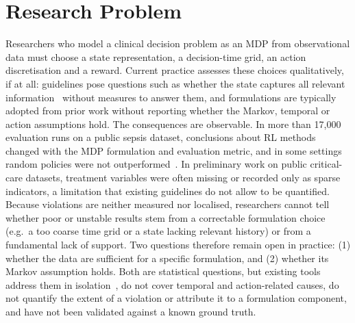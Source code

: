 \documentclass[runningheads]{llncs}
\begin{document}
\section{Research Problem}
Researchers who model a clinical decision problem as an MDP from observational data must choose a state representation, a decision-time grid, an action discretisation and a reward. Current practice assesses these choices qualitatively, if at all: guidelines pose questions such as whether the state captures all relevant information~\cite{Gottesman2019} without measures to answer them, and formulations are typically adopted from prior work without reporting whether the Markov, temporal or action assumptions hold. The consequences are observable. In more than 17,000 evaluation runs on a public sepsis dataset, conclusions about RL methods changed with the MDP formulation and evaluation metric, and in some settings random policies were not outperformed~\cite{Luo2024}. In preliminary work on public critical-care datasets, treatment variables were often missing or recorded only as sparse indicators, a limitation that existing guidelines do not allow to be quantified. Because violations are neither measured nor localised, researchers cannot tell whether poor or unstable results stem from a correctable formulation choice (e.g.\ a too coarse time grid or a state lacking relevant history) or from a fundamental lack of support. Two questions therefore remain open in practice: (1) whether the data are sufficient for a specific formulation, and (2) whether its Markov assumption holds. Both are statistical questions, but existing tools address them in isolation~\cite{Shi2020,Petersen2012}, do not cover temporal and action-related causes, do not quantify the extent of a violation or attribute it to a formulation component, and have not been validated against a known ground truth.
\end{document}

